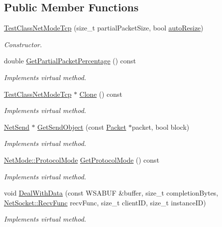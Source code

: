 \subsection*{Public Member Functions}
\begin{DoxyCompactItemize}
\item 
\hyperlink{class_test_class_net_mode_tcp_a670405e5cedb9dff7d58169c81400cac}{TestClassNetModeTcp} (size\_\-t partialPacketSize, bool \hyperlink{class_net_mode_tcp_ae1bb51196acb2d71e38ce60b0860a1fc}{autoResize})
\begin{DoxyCompactList}\small\item\em Constructor. \item\end{DoxyCompactList}\item 
double \hyperlink{class_test_class_net_mode_tcp_a21ce248a37883cc5503dc5d1383b3075}{GetPartialPacketPercentage} () const 
\begin{DoxyCompactList}\small\item\em Implements virtual method. \item\end{DoxyCompactList}\item 
\hyperlink{class_test_class_net_mode_tcp}{TestClassNetModeTcp} $\ast$ \hyperlink{class_test_class_net_mode_tcp_a749f5c4ff447ea11f20576827e973e8c}{Clone} () const 
\begin{DoxyCompactList}\small\item\em Implements virtual method. \item\end{DoxyCompactList}\item 
\hyperlink{class_net_send}{NetSend} $\ast$ \hyperlink{class_test_class_net_mode_tcp_af8de69cfdd1b8ff8f88857b5f43c035a}{GetSendObject} (const \hyperlink{class_packet}{Packet} $\ast$packet, bool block)
\begin{DoxyCompactList}\small\item\em Implements virtual method. \item\end{DoxyCompactList}\item 
\hyperlink{class_net_mode_a43cfa55ee6a4db66a8d7d6c27f766964}{NetMode::ProtocolMode} \hyperlink{class_test_class_net_mode_tcp_ad51dc21b38ba3446a76929ab35233076}{GetProtocolMode} () const 
\begin{DoxyCompactList}\small\item\em Implements virtual method. \item\end{DoxyCompactList}\item 
void \hyperlink{class_test_class_net_mode_tcp_aaf6e498b154805343b3206f7b4f61edf}{DealWithData} (const WSABUF \&buffer, size\_\-t completionBytes, \hyperlink{class_net_socket_a52b5f4de8d0a47fd8620f542b21c076c}{NetSocket::RecvFunc} recvFunc, size\_\-t clientID, size\_\-t instanceID)
\begin{DoxyCompactList}\small\item\em Implements virtual method. \item\end{DoxyCompactList}\end{DoxyCompactItemize}


